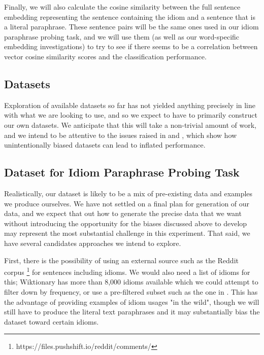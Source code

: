 \documentclass[11pt,a4paper]{article}
\begin{document}
 Finally, we will also calculate the cosine similarity between the full sentence embedding representing the sentence containing the idiom and a sentence that is a literal paraphrase. These sentence pairs will be the same ones used in our idiom paraphrase probing task, and we will use them (as well as our word-specific embedding investigations) to try to see if there seems to be a correlation between vector cosine similarity scores and the classification performance.

\subsection{Datasets}
Exploration of available datasets so far has not yielded anything precisely in line with what we are looking to use, and so we expect to have to primarily construct our own datasets. We anticipate that this will take a non-trivial amount of work, and we intend to be attentive to the issues raised in \citep{niven2019probing} and \citep{mccoy2019right}, which show how unintentionally biased datasets can lead to inflated performance.

\subsection{Dataset for Idiom Paraphrase Probing Task}
\vspace{5mm}
Realistically, our dataset is likely to be a mix of pre-existing data and examples we produce ourselves. We have not settled on a final plan for generation of our data, and we expect that out how to generate the precise data that we want without introducing the opportunity for the biases discussed above to develop may represent the most substantial challenge in this experiment. That said, we have several candidates approaches we intend to explore.

First, there is the possibility of using an external source such as the Reddit corpus \footnote{https://files.pushshift.io/reddit/comments/} for sentences including idioms. We would also need a list of idioms for this; Wiktionary has more than 8,000 idioms available which we could attempt to filter down by frequency, or use a pre-filtered subset such as the one in \cite{Jochim2018SLIDEA}. This has the advantage of providing examples of idiom usages "in the wild", though we will still have to produce the literal text paraphrases and it may substantially bias the dataset toward certain idioms. 

\end{document}
